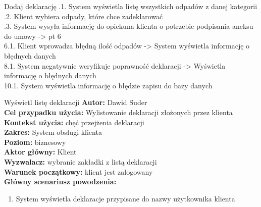 \begin{usecase}{Dodaj deklarację}
			.1. System wyświetla listę wszystkich odpadów z danej kategorii \\
			.2. Klient wybiera odpady, które chce zadeklarować \\
			.3. System wysyła informację do opiekuna klienta o potrzebie podpisania aneksu do umowy -> pt 6 \\
		6.1. Klient wprowadza błędną ilość odpadów -> System wyświetla informację o błędnych danych \\
		8.1. System negatywnie weryfikuje poprawność deklaracji -> Wyświetla informację o błędnych danych \\
		10.1. System wyświetla informację o błędzie zapisu do bazy danych \\
\end{usecase}

\begin{usecase}{Wyświetl listę deklaracji}
	\textbf{Autor:} Dawid Suder \\
	\textbf{Cel przypadku użycia:} Wylistowanie deklaracji złożonych przez klienta \\
	\textbf{Kontekst użycia:} chęć przejżenia deklaracji\\
	\textbf{Zakres:} System obsługi klienta \\
	\textbf{Poziom:} biznesowy \\
	\textbf{Aktor główny:} Klient\\
	\textbf{Wyzwalacz:} wybranie zakładki z listą deklaracji \\
	\textbf{Warunek początkowy:} klient jest zalogowany \\
	\textbf{Główny scenariusz powodzenia:} \\
		\begin{enumerate}
			\item System wyświetla deklaracje przypisane do nazwy użytkownika klienta
		\end{enumerate}
\end{usecase}

